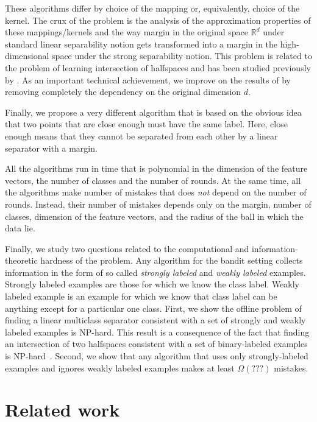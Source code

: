 \documentclass[12pt]{article}
\newcommand{\R}{\mathbb{R}}  %
\begin{document}
These algorithms differ by choice of the mapping or, equivalently, choice of the
kernel. The crux of the problem is the analysis of the approximation properties
of these mappings/kernels and the way margin in the original space $\R^d$ under
standard linear separability notion gets transformed into a margin in the
high-dimensional space under the strong separability notion. This problem is
related to the problem of learning intersection of halfspaces and has been
studied previously by \cite{Klivans-Servedio-2008}. As an important technical
achievement, we improve on the results of \cite{Klivans-Servedio-2008} by
removing completely the dependency on the original dimension $d$.

Finally, we propose a very different algorithm that is based on the obvious idea
that two points that are close enough must have the same label. Here, close
enough means that they cannot be separated from each other by a linear separator
with a margin.

All the algorithms run in time that is polynomial in the dimension of the
feature vectors, the number of classes and the number of rounds. At the same
time, all the algorithms make number of mistakes that does \emph{not} depend
on the number of rounds. Instead, their number of mistakes depends only on the
margin, number of classes, dimension of the feature vectors, and the radius of
the ball in which the data lie.

Finally, we study two questions related to the computational and
information-theoretic hardness of the problem. Any algorithm for the bandit
setting collects information in the form of so called \emph{strongly labeled}
and \emph{weakly labeled} examples. Strongly labeled examples are those for
which we know the class label. Weakly labeled example is an example for which we
know that class label can be anything except for a particular one class. First,
we show the offline problem of finding a linear multiclass separator consistent
with a set of strongly and weakly labeled examples is NP-hard. This result is a
consequence of the fact that finding an intersection of two halfspaces
consistent with a set of binary-labeled examples is
NP-hard~\citep{Blum-Rivest-1993}. Second, we show that any algorithm that uses
only strongly-labeled examples and ignores weakly labeled examples makes at
least $\Omega(???)$ mistakes.


\section{Related work}
\label{section:related-work}
\end{document}
